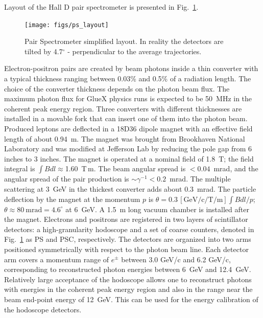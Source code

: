 Layout of the Hall D pair spectrometer is presented in Fig.~\ref{fig:beam:ps-layout}. 
\begin{figure}[h]
\begin{center}
   \texttt{[image: figs/ps\_layout]}
\end{center}
\caption{Pair Spectrometer simplified layout. In reality the detectors 
         are tilted by 4.7$^\circ$ - perpendicular to the average
         trajectories.
        }
\label{fig:beam:ps-layout} 
\end{figure}

Electron-positron pairs are created by beam photons inside a thin
converter with a typical thickness ranging between 0.03\% and 0.5\% of
a radiation length. The choice of the converter thickness depends on
the photon beam flux. The maximum photon flux for GlueX physics runs
is expected to be 50~MHz in the coherent peak energy region. Three
converters with different thicknesses are installed in a movable fork
that can insert one of them into the photon beam. Produced leptons are
deflected in a 18D36 dipole magnet with an effective field length of
about 0.94~m. The magnet was brought from Brookhaven National
Laboratory and was modified at Jefferson Lab by reducing the pole gap
from 6 inches to 3 inches. The magnet is operated at a nominal field
of 1.8~T; the field integral is $\int{}Bdl\approx$1.60~T\,m. The beam
angular spread is $<0.04$~mrad, and the angular spread of the pair
production is $\sim{}\gamma^{-1}<0.2$~mrad. The multiple scattering at
3~GeV in the thickest converter adds about 0.3~mrad. The particle
deflection by the magnet at the momentum $p$ is
$\theta{}=0.3\,[\mathrm{GeV/c/T/m}]\int{}Bdl/p$;
$\theta\approx{}80~\mathrm{mrad}=4.6^\circ$ at 6~GeV.  
A 1.5~m long
vacuum chamber is installed after the magnet. Electrons and positrons
are registered in two layers of scintillator detectors: a
high-granularity hodoscope and a set of coarse counters, denoted in
Fig.~\ref{fig:beam:ps-layout} as PS and PSC, respectively. The
detectors are organized into two arms positioned symmetrically with
respect to the photon beam line.  Each detector arm covers a momentum
range of $e^\pm$ between 3.0 GeV/c and 6.2 GeV/c, corresponding to
reconstructed photon energies between 6~GeV and 12.4~GeV. Relatively
large acceptance of the hodoscope allows one to reconstruct photons
with energies in the coherent peak energy region and also in the range
near the beam end-point energy of 12~GeV. This can be used for the
energy calibration of the hodoscope detectors.

